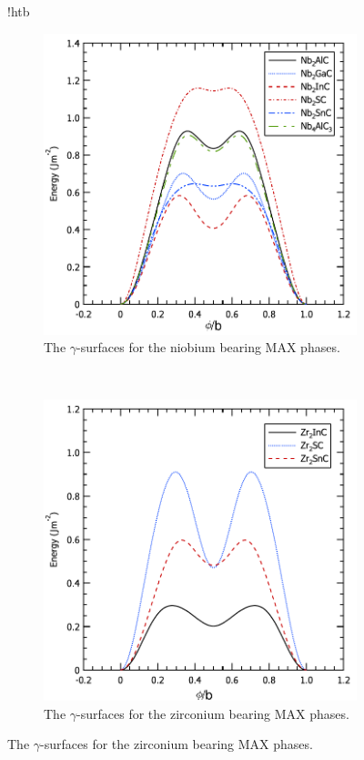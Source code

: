 \begin{figure}{!htb}
\centering
\begin{subfigure}{5cm}
\centering
\includegraphics[width=\textwidth]{Nb_gamma_surfaces}
\caption{The $\gamma$-surfaces for the niobium bearing MAX phases.\label{fig:Nb_gamma_surfaces}}
\end{subfigure}
~
\begin{subfigure}{5cm}
\centering
\includegraphics[width=\textwidth]{Zr_gamma_surfaces}
\caption{The $\gamma$-surfaces for the zirconium bearing MAX phases.\label{fig:Zr_gamma_surfaces}}
\end{subfigure}


\end{figure}
